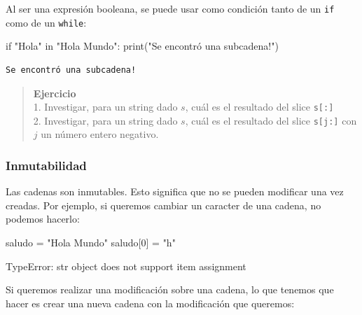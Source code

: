 \documentclass[
  letterpaper,
  DIV=11,
  numbers=noendperiod]{scrreprt}
\newenvironment{Shaded}{\begin{snugshade}}{\end{snugshade}}
\newcommand{\BuiltInTok}[1]{\textcolor[rgb]{0.00,0.23,0.31}{#1}}
\newcommand{\ControlFlowTok}[1]{\textcolor[rgb]{0.00,0.23,0.31}{#1}}
\newcommand{\DecValTok}[1]{\textcolor[rgb]{0.68,0.00,0.00}{#1}}
\newcommand{\KeywordTok}[1]{\textcolor[rgb]{0.00,0.23,0.31}{#1}}
\newcommand{\NormalTok}[1]{\textcolor[rgb]{0.00,0.23,0.31}{#1}}
\newcommand{\OperatorTok}[1]{\textcolor[rgb]{0.37,0.37,0.37}{#1}}
\newcommand{\StringTok}[1]{\textcolor[rgb]{0.13,0.47,0.30}{#1}}
\begin{document}
Al ser una expresión booleana, se puede usar como condición tanto de un
\texttt{if} como de un \texttt{while}:

\begin{Shaded}
\begin{Highlighting}[]
\ControlFlowTok{if} \StringTok{"Hola"} \KeywordTok{in} \StringTok{"Hola Mundo"}\NormalTok{:}
    \BuiltInTok{print}\NormalTok{(}\StringTok{"Se encontró una subcadena!"}\NormalTok{)}
\end{Highlighting}
\end{Shaded}

\begin{verbatim}
Se encontró una subcadena!
\end{verbatim}

\begin{quote}
\textbf{Ejercicio}\\
1. Investigar, para un string dado \(s\), cuál es el resultado del slice
\texttt{s{[}:{]}}\\
2. Investigar, para un string dado \(s\), cuál es el resultado del slice
\texttt{s{[}j:{]}} con \(j\) un número entero negativo.
\end{quote}

\subsubsection{Inmutabilidad}\label{inmutabilidad}

Las cadenas son inmutables. Esto significa que no se pueden modificar
una vez creadas. Por ejemplo, si queremos cambiar un caracter de una
cadena, no podemos hacerlo:

\begin{Shaded}
\begin{Highlighting}[]
\NormalTok{saludo }\OperatorTok{=} \StringTok{"Hola Mundo"}
\NormalTok{saludo[}\DecValTok{0}\NormalTok{] }\OperatorTok{=} \StringTok{"h"}
\end{Highlighting}
\end{Shaded}

\begin{Shaded}
\begin{Highlighting}[]
\NormalTok{TypeError: \textquotesingle{}str\textquotesingle{} object does not support item assignment}
\end{Highlighting}
\end{Shaded}

Si queremos realizar una modificación sobre una cadena, lo que tenemos
que hacer es crear una nueva cadena con la modificación que queremos:
\end{document}
